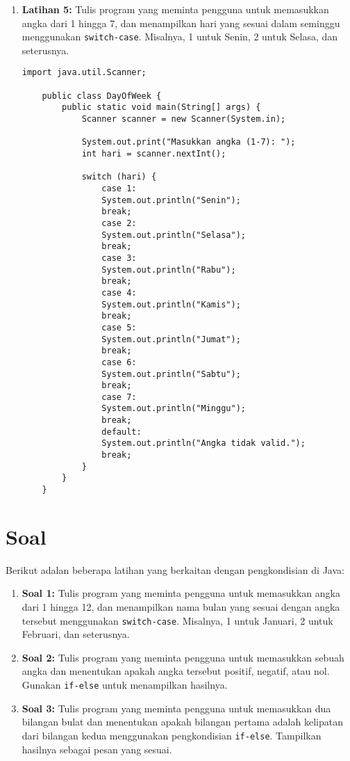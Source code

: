 \begin{enumerate}
\item \textbf{Latihan 5:} Tulis program yang meminta pengguna untuk memasukkan angka dari 1 hingga 7, dan menampilkan hari yang sesuai dalam seminggu menggunakan \texttt{switch-case}. Misalnya, 1 untuk Senin, 2 untuk Selasa, dan seterusnya.

\begin{lstlisting}[style=JavaStyle]
	import java.util.Scanner;
	
	public class DayOfWeek {
		public static void main(String[] args) {
			Scanner scanner = new Scanner(System.in);
			
			System.out.print("Masukkan angka (1-7): ");
			int hari = scanner.nextInt();
			
			switch (hari) {
				case 1:
				System.out.println("Senin");
				break;
				case 2:
				System.out.println("Selasa");
				break;
				case 3:
				System.out.println("Rabu");
				break;
				case 4:
				System.out.println("Kamis");
				break;
				case 5:
				System.out.println("Jumat");
				break;
				case 6:
				System.out.println("Sabtu");
				break;
				case 7:
				System.out.println("Minggu");
				break;
				default:
				System.out.println("Angka tidak valid.");
				break;
			}
		}
	}
\end{lstlisting}

\end{enumerate}


\section {Soal}

Berikut adalan beberapa latihan yang berkaitan dengan pengkondisian di Java:

\begin{enumerate}
	
\item \textbf{Soal 1:} Tulis program yang meminta pengguna untuk memasukkan angka dari 1 hingga 12, dan menampilkan nama bulan yang sesuai dengan angka tersebut menggunakan \texttt{switch-case}. Misalnya, 1 untuk Januari, 2 untuk Februari, dan seterusnya.

\item \textbf{Soal 2:} Tulis program yang meminta pengguna untuk memasukkan sebuah angka dan menentukan apakah angka tersebut positif, negatif, atau nol. Gunakan \texttt{if-else} untuk menampilkan hasilnya.

\item \textbf{Soal 3:} Tulis program yang meminta pengguna untuk memasukkan dua bilangan bulat dan menentukan apakah bilangan pertama adalah kelipatan dari bilangan kedua menggunakan pengkondisian \texttt{if-else}. Tampilkan hasilnya sebagai pesan yang sesuai.

\end{enumerate}